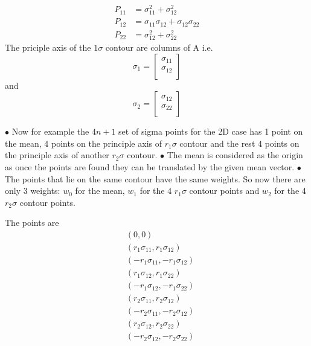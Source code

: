 \documentclass[landscape]{slides}
\begin{document}
\begin{slide} 
 \begin{align*}
 P_{11}&=\sigma_{11}^2+\sigma_{12}^2\\
 P_{12}&=\sigma_{11}\sigma_{12}+\sigma_{12}\sigma_{22}\\
 P_{22}&=\sigma_{12}^2+\sigma_{22}^2
 \end{align*}
 The priciple axis of the $1\sigma$ contour are columns of A i.e.
 \[\sigma_1=\left[ {\begin{array}{c}
 \sigma_{11}  \\
 \sigma_{12}  \\
 \end{array} } \right]\]
 and
  \[\sigma_2=\left[ {\begin{array}{c}
 \sigma_{12}  \\
 \sigma_{22}  \\
 \end{array} } \right]\]
 	\end{slide}
\begin{slide}
 $\bullet$ Now for example the $4n+1$ set of sigma points for the 2D case has 1 point on the mean, 4 points on the principle axis of  $r_1\sigma$ contour and the rest 4 points on the principle axis of another $r_2\sigma$ contour.\newline\newline 
 $\bullet$ The mean is considered as the origin as once the points are found they can be translated by the given mean vector. \newline\newline
 $\bullet$ The points that lie on the same contour have the same weights. So now there are only 3 weights:  $w_0$ for the mean, $w_1$ for the 4 $r_1\sigma$ contour points and $w_2$ for the 4 $r_2\sigma$ contour points. 
 \end{slide}
 \begin{slide}
 The points are
 \begin{align*}
 &(0,0)\\
 &(r_1\sigma_{11},r_1\sigma_{12})\\
 &(-r_1\sigma_{11},-r_1\sigma_{12})\\
 &(r_1\sigma_{12},r_1\sigma_{22})\\
 &(-r_1\sigma_{12},-r_1\sigma_{22})\\
 &(r_2\sigma_{11},r_2\sigma_{12})\\
 &(-r_2\sigma_{11},-r_2\sigma_{12})\\
 &(r_2\sigma_{12},r_2\sigma_{22})\\
 &(-r_2\sigma_{12},-r_2\sigma_{22})
 \end{align*}
   	\end{slide}
\end{document}
